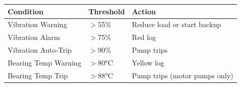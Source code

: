 \documentclass[10pt,a5paper]{article}
\begin{document}
\begin{center}
\begin{tabular}{lll}
\toprule
\textbf{Condition} & \textbf{Threshold} & \textbf{Action} \\
\midrule
Vibration Warning       & $>$55\%  & Reduce load or start backup \\
Vibration Alarm         & $>$75\%  & Red log \\
Vibration Auto-Trip     & $>$90\%  & Pump trips \\
Bearing Temp Warning    & $>$80°C  & Yellow log \\
Bearing Temp Trip       & $>$88°C  & Pump trips (motor pumps only) \\
\bottomrule
\end{tabular}
\end{center}



\end{document}
